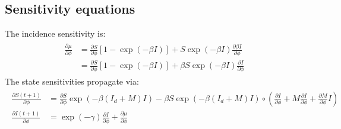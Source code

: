 \subsection*{Sensitivity equations}
The incidence sensitivity is:
\begin{align}\begin{split}\label{eq:sens_mu_cross}
    \frac{\partial \mu}{\partial \phi} %
    &= \frac{\partial S}{\partial \phi} \left[1 - \exp(-\beta I)\right] +
    S \exp(-\beta I) \frac{\partial \beta I}{\partial \phi} \\
    &=\frac{\partial S}{\partial \phi} \left[1 - \exp(-\beta I)\right] +
    \beta S \exp(-\beta I) \frac{\partial I}{\partial \phi}
\end{split}\end{align}
%
%
The state sensitivities propagate via:
\begin{align}\begin{split}\label{eq:sens_cross}
\frac{\partial S(t+1)}{\partial \phi} &=
\frac{\partial S}{\partial \phi} \exp(-\beta(I_d +M) I) - \beta S \exp(-\beta(I_d + M)I) \circ \left(
\frac{\partial I}{\partial \phi} + M\frac{\partial I}{\partial \phi} + \frac{\partial M}{\partial \phi}I \right) \\
\frac{\partial I(t+1)}{\partial \phi} &= \exp(-\gamma)
\frac{\partial I}{\partial \phi} + \frac{\partial \mu}{\partial \phi}
\end{split}\end{align}

